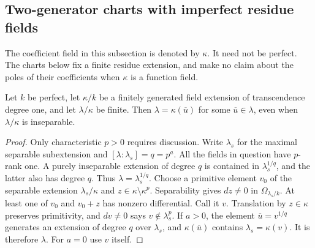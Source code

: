 \subsection{Two-generator charts with imperfect residue fields}

The coefficient field in this subsection is denoted by $\kappa$.
It need not be perfect.  The charts below fix a finite residue
extension, and make no claim about the poles of their coefficients
when $\kappa$ is a function field.

\begin{lemma}
\label{D:one-variable-residue-primitive}
Let $k$ be perfect, let $\kappa/k$ be a finitely generated field
extension of transcendence degree one, and let $\lambda/\kappa$
be finite.  Then $\lambda=\kappa(\overline u)$ for some
$\overline u\in\lambda$, even when $\lambda/\kappa$ is inseparable.
\end{lemma}

\begin{proof}
Only characteristic $p>0$ requires discussion.  Write $\lambda_s$
for the maximal separable subextension and
$[\lambda:\lambda_s]=q=p^a$.  All the fields in question have
$p$-rank one.  A purely inseparable extension of degree $q$ is
contained in $\lambda_s^{1/q}$, and the latter also has degree
$q$.  Thus $\lambda=\lambda_s^{1/q}$.
Choose a primitive element $v_0$ of the separable extension
$\lambda_s/\kappa$ and $z\in\kappa\setminus\kappa^p$.
Separability gives $dz\ne0$ in $\Omega_{\lambda_s/k}$.
At least one of $v_0$ and $v_0+z$ has nonzero differential.
Call it $v$.  Translation by $z\in\kappa$ preserves primitivity,
and $dv\ne0$ says $v\notin\lambda_s^p$.
If $a>0$, the element $\overline u=v^{1/q}$ generates an extension
of degree $q$ over $\lambda_s$, and $\kappa(\overline u)$ contains
$\lambda_s=\kappa(v)$.  It is therefore $\lambda$.
For $a=0$ use $v$ itself.
\end{proof}

